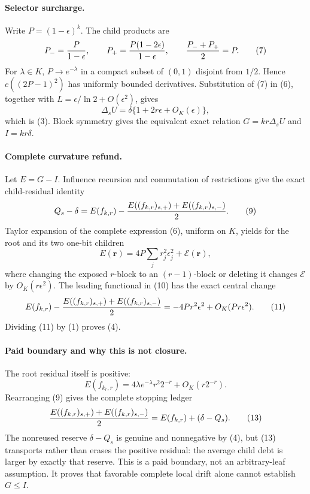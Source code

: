 \paragraph{Selector surcharge.}
Write $P=(1-\epsilon)^k$.  The child products are
\[
 P_-={P\over1-\epsilon},\qquad
 P_+={P(1-2\epsilon)\over1-\epsilon},\qquad
 {P_-+P_+\over2}=P.                                    \tag{7}
\]
For $\lambda\in K$, $P\to e^{-\lambda}$ in a compact subset of
$(0,1)$ disjoint from $1/2$.  Hence $c((2P-1)^2)$ has uniformly bounded
derivatives.  Substitution of (7) in (6), together with
$L=\epsilon/\ln2+O(\epsilon^2)$, gives
\[
 \Delta_sU=\delta\{1+2r\epsilon+O_K(\epsilon)\},       \tag{8}
\]
which is (3).  Block symmetry gives the equivalent exact relation
$G=kr\Delta_sU$ and $I=kr\delta$.

\paragraph{Complete curvature refund.}
Let $E=G-I$.  Influence recursion and commutation of restrictions give
the exact child-residual identity
\[
 Q_s-\delta=E(f_{k,r})-
 {E((f_{k,r})_{s,+})+E((f_{k,r})_{s,-})\over2}.        \tag{9}
\]
Taylor expansion of the complete expression (6), uniform on $K$, yields
for the root and its two one-bit children
\[
 E(\mathbf r)=4P\sum_j r_j^2\epsilon_j^2
                 +\mathcal E(\mathbf r),              \tag{10}
\]
where changing the exposed $r$-block to an $(r-1)$-block or deleting it
changes $\mathcal E$ by $O_K(r\epsilon^2)$.  The leading functional in
(10) has the exact central change
\[
 E(f_{k,r})-
 {E((f_{k,r})_{s,+})+E((f_{k,r})_{s,-})\over2}
 =-4Pr^2\epsilon^2+O_K(Pr\epsilon^2).                 \tag{11}
\]
Dividing (11) by (1) proves (4).

\paragraph{Paid boundary and why this is not closure.}
The root residual itself is positive:
\[
 E(f_{k_r,r})
 =4\lambda e^{-\lambda}r^2 2^{-r}
   +O_K(r2^{-r}).                                      \tag{12}
\]
Rearranging (9) gives the complete stopping ledger
\[
 {E((f_{k,r})_{s,+})+E((f_{k,r})_{s,-})\over2}
 =E(f_{k,r})+(\delta-Q_s).                             \tag{13}
\]
The nonreused reserve $\delta-Q_s$ is genuine and nonnegative by (4),
but (13) transports rather than erases the positive residual: the average
child debt is larger by exactly that reserve.  This is a paid boundary,
not an arbitrary-leaf assumption.  It proves that favorable complete
local drift alone cannot establish $G\le I$.

